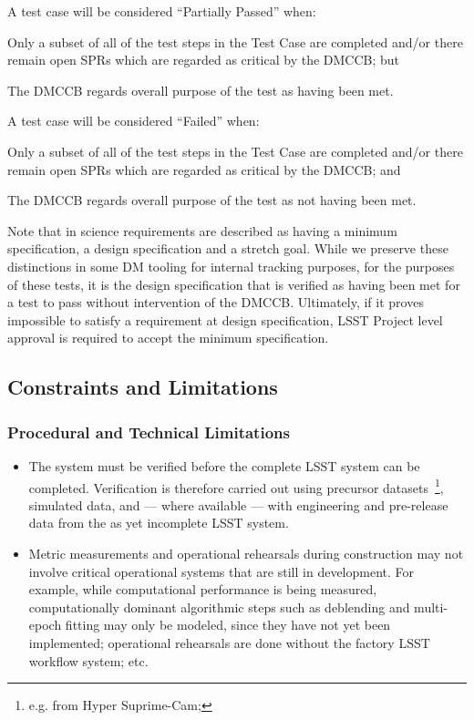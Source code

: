 A test case will be considered ``Partially Passed'' when:

\begin{itemize_single}
\item{Only a subset of all of the test steps in the Test Case are completed and/or there remain open SPRs which are regarded as critical by the DMCCB; but}
\item{The DMCCB regards overall purpose of the test as having been met.}
\end{itemize_single}

A test case will be considered ``Failed'' when:

\begin{itemize_single}
\item{Only a subset of all of the test steps in the Test Case are completed and/or there remain open SPRs which are regarded as critical by the DMCCB; and}
\item{The DMCCB regards overall purpose of the test as not having been met.}
\end{itemize_single}

Note that in  science requirements are described as having a minimum specification, a design specification and a stretch goal.
While we preserve these distinctions in some DM tooling for internal tracking purposes, for the purposes of these tests, it is the design specification that is verified as having been met for a test to pass without intervention of the DMCCB.
Ultimately, if it proves impossible to satisfy a requirement at design specification, LSST Project level approval is required to accept the minimum specification.

\subsection{Constraints and Limitations}

\subsubsection{Procedural and Technical Limitations}

\begin{itemize}


  \item{The \product{} system must be verified before the complete LSST system can be completed. Verification is therefore carried out using precursor datasets~\footnote{e.g. from Hyper Suprime-Cam; }, simulated data, and --- where available --- with engineering and pre-release data from the as yet incomplete LSST system.}

  \item{Metric measurements and operational rehearsals during construction may not involve critical operational systems that are still in development. For example, while computational performance is being measured, computationally dominant algorithmic steps such as deblending and multi-epoch fitting may only be modeled, since they have not yet been implemented; operational rehearsals are done without the factory LSST workflow system; etc.}

\end{itemize}

